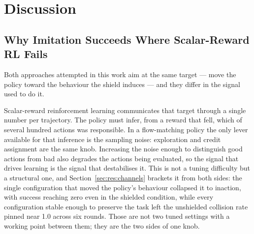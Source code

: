 %
%
%

\chapter{Discussion}\label{ch:discussion}

\section{Why Imitation Succeeds Where Scalar-Reward RL Fails}\label{sec:disc:mechanism}

Both approaches attempted in this work aim at the same target --- move the policy toward the
behaviour the shield induces --- and they differ in the signal used to do it.

Scalar-reward reinforcement learning communicates that target through a single number per
trajectory. The policy must infer, from a reward that fell, which of several hundred actions was
responsible. In a flow-matching policy the only lever available for that inference is the sampling
noise: exploration and credit assignment are the same knob. Increasing the noise enough to
distinguish good actions from bad also degrades the actions being evaluated, so the signal that
drives learning is the signal that destabilises it. This is not a tuning difficulty but a
structural one, and Section~\ref{sec:res:channels} brackets it from both sides: the single
configuration that moved the policy's behaviour collapsed it to inaction, with success reaching
zero even in the shielded condition, while every configuration stable enough to preserve the task
left the unshielded collision rate pinned near 1.0 across six rounds. Those are not two tuned
settings with a working point between them; they are the two sides of one knob.

